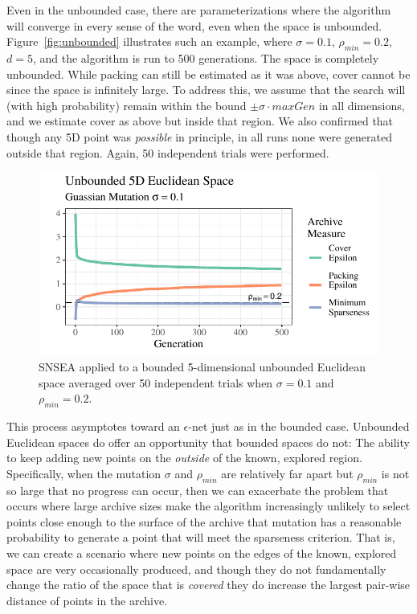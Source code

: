 \documentclass[twoside]{article}
\begin{document}
Even in the unbounded case, there are parameterizations where the algorithm will converge in every sense of the word, even when the space is unbounded.  Figure~\ref{fig:unbounded} illustrates such an example, where $\sigma=0.1$, $\rho_{min}= 0.2$, $d=5$, and the algorithm is run to 500 generations.  The space is completely unbounded.  While packing can still be estimated as it was above, cover cannot be since the space is infinitely large.  To address this, we assume that the search will (with high probability) remain within the bound $\pm\sigma\cdot maxGen$ in all dimensions, and we estimate cover as above but inside that region.  We also confirmed that though any 5D point was \emph{possible} in principle, in all runs none were generated outside that region.  Again, 50 independent trials were performed.
%
\begin{figure}[t]
  \center\includegraphics[width=1\textwidth]{Figures/unbounded-s01-r02-NOPOP.pdf}
  \caption{\label{fig:unbounded:nopop:0102} SNSEA applied to a bounded 5-dimensional unbounded Euclidean space averaged over 50 independent trials when $\sigma=0.1$ and $\rho_{min}=0.2$.}
\end{figure}
%
This process asymptotes toward an $\epsilon$-net just as in the bounded case.  Unbounded Euclidean spaces do offer an opportunity that bounded spaces do not:  The ability to keep adding new points on the \emph{outside} of the known, explored region.  Specifically, when the mutation $\sigma$ and $\rho_{min}$ are relatively far apart but $\rho_{min}$ is not so large that no progress can occur, then we can exacerbate the problem that occurs where large archive sizes make the algorithm increasingly unlikely to select points close enough to the surface of the archive that mutation has a reasonable probability to generate a point that will meet the sparseness criterion.  That is, we can create a scenario where new points on the edges of the known, explored space are very occasionally produced, and though they do not fundamentally change the ratio of the space that is \emph{covered} they do increase the largest pair-wise distance of points in the archive.
\end{document}

